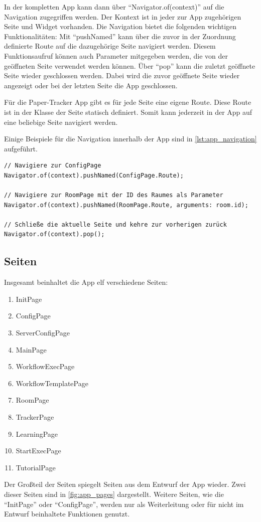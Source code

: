In der kompletten App kann dann über \enquote{Navigator.of(context)} auf die Navigation zugegriffen werden.
Der Kontext ist in jeder zur App zugehörigen Seite und Widget vorhanden.
Die Navigation bietet die folgenden wichtigen Funktionalitäten:
Mit \enquote{pushNamed} kann über die zuvor in der Zuordnung definierte Route auf die dazugehörige Seite navigiert werden.
Diesem Funktionsaufruf können auch Parameter mitgegeben werden, die von der geöffneten Seite verwendet werden können.
Über \enquote{pop} kann die zuletzt geöffnete Seite wieder geschlossen werden.
Dabei wird die zuvor geöffnete Seite wieder angezeigt oder bei der letzten Seite die App geschlossen.

Für die Paper-Tracker App gibt es für jede Seite eine eigene Route.
Diese Route ist in der Klasse der Seite statisch definiert.
Somit kann jederzeit in der App auf eine beliebige Seite navigiert werden.

Einige Beispiele für die Navigation innerhalb der App sind in \autoref{lst:app_navigation} aufgeführt.

\begin{lstlisting}[caption={Beispiele für die Navigation innerhalb der App},label={lst:app_navigation},tabsize=2]
// Navigiere zur ConfigPage
Navigator.of(context).pushNamed(ConfigPage.Route);

// Navigiere zur RoomPage mit der ID des Raumes als Parameter
Navigator.of(context).pushNamed(RoomPage.Route, arguments: room.id);

// Schließe die aktuelle Seite und kehre zur vorherigen zurück
Navigator.of(context).pop();
\end{lstlisting}

\subsection{Seiten}

Insgesamt beinhaltet die App elf verschiedene Seiten:
\begin{enumerate}
	\item InitPage
	\item ConfigPage
	\item ServerConfigPage
	\item MainPage
	\item WorkflowExecPage
	\item WorkflowTemplatePage
	\item RoomPage
	\item TrackerPage
	\item LearningPage
	\item StartExecPage
	\item TutorialPage
\end{enumerate}
Der Großteil der Seiten spiegelt Seiten aus dem Entwurf der App wieder.
Zwei dieser Seiten sind in \autoref{fig:app_pages} dargestellt.
Weitere Seiten, wie die \enquote{InitPage} oder \enquote{ConfigPage}, werden nur als Weiterleitung oder für nicht im
Entwurf beinhaltete Funktionen genutzt.

